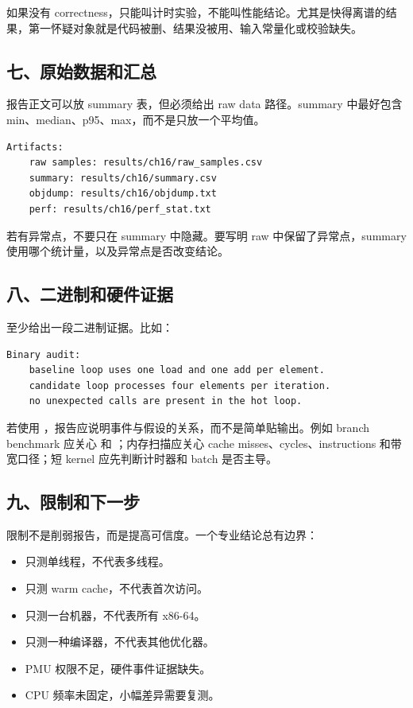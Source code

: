 如果没有 correctness，只能叫计时实验，不能叫性能结论。尤其是快得离谱的结果，第一怀疑对象就是代码被删、结果没被用、输入常量化或校验缺失。

\subsection{七、原始数据和汇总}

报告正文可以放 summary 表，但必须给出 raw data 路径。summary 中最好包含 min、median、p95、max，而不是只放一个平均值。

\begin{lstlisting}
Artifacts:
    raw samples: results/ch16/raw_samples.csv
    summary: results/ch16/summary.csv
    objdump: results/ch16/objdump.txt
    perf: results/ch16/perf_stat.txt
\end{lstlisting}

若有异常点，不要只在 summary 中隐藏。要写明 raw 中保留了异常点，summary 使用哪个统计量，以及异常点是否改变结论。

\subsection{八、二进制和硬件证据}

至少给出一段二进制证据。比如：

\begin{lstlisting}
Binary audit:
    baseline loop uses one load and one add per element.
    candidate loop processes four elements per iteration.
    no unexpected calls are present in the hot loop.
\end{lstlisting}

若使用 ，报告应说明事件与假设的关系，而不是简单贴输出。例如 branch benchmark 应关心  和 ；内存扫描应关心 cache misses、cycles、instructions 和带宽口径；短 kernel 应先判断计时器和 batch 是否主导。

\subsection{九、限制和下一步}

限制不是削弱报告，而是提高可信度。一个专业结论总有边界：

\begin{itemize}
  \item 只测单线程，不代表多线程。
  \item 只测 warm cache，不代表首次访问。
  \item 只测一台机器，不代表所有 x86-64。
  \item 只测一种编译器，不代表其他优化器。
  \item PMU 权限不足，硬件事件证据缺失。
  \item CPU 频率未固定，小幅差异需要复测。
\end{itemize}

